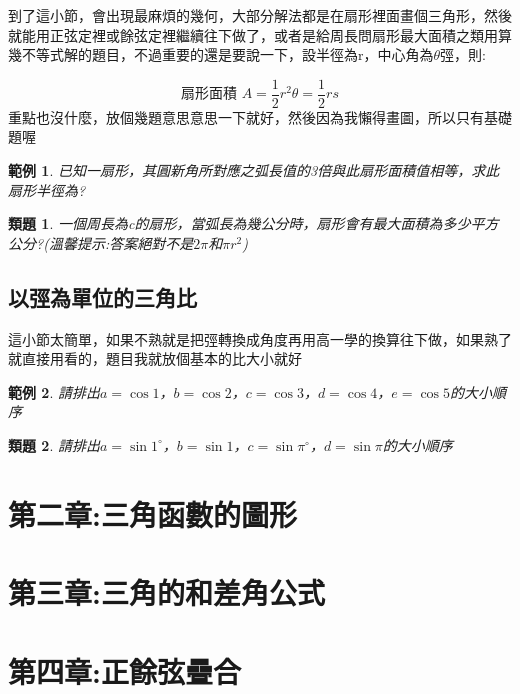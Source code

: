 \documentclass{article}
\newtheorem{example}{範例}[section]
\newtheorem{exercise}{類題}[section]
\begin{document}
到了這小節，會出現最麻煩的幾何，大部分解法都是在扇形裡面畫個三角形，然後就能用正弦定裡或餘弦定裡繼續往下做了，或者是給周長問扇形最大面積之類用算幾不等式解的題目，不過重要的還是要說一下，設半徑為r，中心角為$\theta$弳，則:

\[\text{扇形面積 } A=\frac{1}{2}r^2\theta=\frac{1}{2}rs \]
重點也沒什麼，放個幾題意思意思一下就好，然後因為我懶得畫圖，所以只有基礎題喔
\begin{example}
\normalfont
    已知一扇形，其圓新角所對應之弧長值的3倍與此扇形面積值相等，求此扇形半徑為?
\end{example}
\begin{exercise}
\normalfont
    一個周長為c的扇形，當弧長為幾公分時，扇形會有最大面積為多少平方公分?(溫馨提示:答案絕對不是$2\pi$和$\pi r ^2$)
\end{exercise}

\subsection{以弳為單位的三角比}

這小節太簡單，如果不熟就是把弳轉換成角度再用高一學的換算往下做，如果熟了就直接用看的，題目我就放個基本的比大小就好
\begin{example}
\normalfont
    請排出$a = \cos{1}$，$b = \cos{2}$，$c=\cos{3}$，$d=\cos{4}$，$e=\cos{5}$的大小順序
\end{example}
\begin{exercise}
\normalfont
    請排出$a=\sin1^\circ$，$b =\sin{1}$，$c=\sin{\pi^\circ}$，$d=\sin{\pi}$的大小順序    
\end{exercise}

\section{第二章:三角函數的圖形}
\section{第三章:三角的和差角公式}
\section{第四章:正餘弦疊合}
\end{document}
